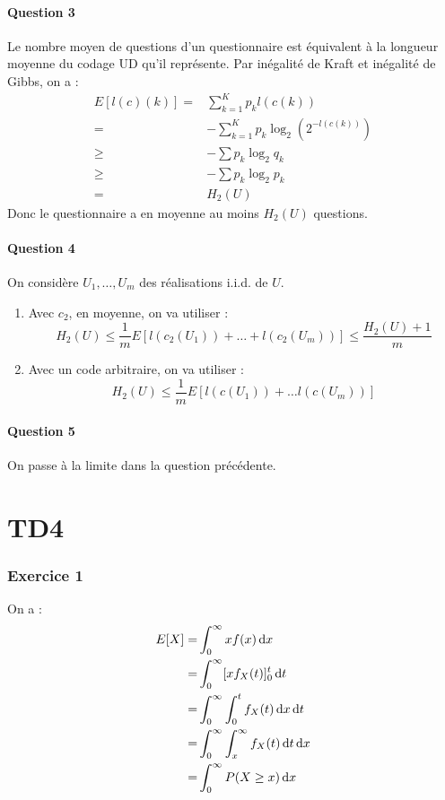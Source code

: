 \documentclass{cours}
\begin{document}
\subsection{Question 3}
Le nombre moyen de questions d'un questionnaire est équivalent à la longueur moyenne du codage UD qu'il représente. Par inégalité de Kraft et inégalité de Gibbs, on a : 
\[
    \begin{aligned}
        E[l(c)(k)] =& \sum_{k = 1}^{K}p_{k}l(c(k))\\
        =& -\sum_{k = 1}^{K}p_{k}\log_{2}(2^{-l(c(k))})\\
        \geq & -\sum p_{k}\log_{2}q_{k}\\
        \geq & -\sum p_{k}\log_{2}p_{k} \\
        = & H_{2}(U)
    \end{aligned}
\]
Donc le questionnaire a en moyenne au moins $H_{2}(U)$ questions. 

\subsection{Question 4}
On considère $U_{1},\ldots, U_{m}$ des réalisations i.i.d. de $U$. 
\begin{enumerate}
\item Avec $c_{2}$, en moyenne, on va utiliser : 
\[
    H_{2}(U) \leq \frac{1}{m}E[l(c_{2}(U_{1})) + \ldots + l(c_{2}(U_{m}))] \leq \frac{H_{2}(U) + 1}{m}
\]
\item Avec un code arbitraire, on va utiliser : 
\[
    H_{2}(U) \leq \frac{1}{m}E[l(c(U_{1})) + \ldots l(c(U_{m}))]
\]
\end{enumerate}


\subsection{Question 5}
On passe à la limite dans la question précédente. 

\part{TD4}
\section{Exercice 1}
On a : 
\[
	\begin{aligned}
		E[X] =& \int_{0}^{\infty}xf(x){\rm \, d} x\\
		=& \int_{0}^{\infty}[xf_{X}(t)]_{0}^{t}{\rm \, d} t\\
		=& \int_{0}^{\infty}\int_{0}^{t}f_{X}(t){\rm \, d} x {\rm \, d} t\\
		=& \int_{0}^{\infty}\int_{x}^{\infty}f_{X}(t){\rm \, d} t{\rm \, d} x\\
		=& \int_{0}^{\infty}P(X\geq x){\rm \, d} x
	\end{aligned}
\]
\end{document}
